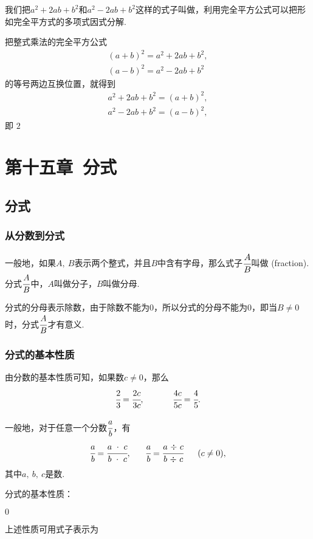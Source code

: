 \documentclass[UTF8,fontset=macnew]{book} %
\begin{document}
				我们把$a^2+2ab+b^2$和$a^2-2ab+b^2$这样的式子叫做\textcolor[RGB]{4,165,218}{}，利用完全平方公式可以把形如完全平方式的多项式因式分解.
				
				把整式乘法的完全平方公式
			$$\begin{gathered}(a+b)^2=a^2+2ab+b^2,\\(a-b)^2=a^2-2ab+b^2\end{gathered}$$
			的等号两边互换位置，就得到
			$$\boxed{\begin{gathered}a^2+2ab+b^2=(a+b)^2,\\a^2-2ab+b^2=(a-b)^2,\end{gathered}}$$
			即\textcolor[RGB]{4,165,218}{ $2$ }
	\chapter{第十五章\ 分式}
		\section{分式}
			\subsection{从分数到分式}
				一般地，如果$A,\ B$表示两个整式，并且$B$中含有字母，那么式子$\cfrac{A}{B}$叫做\textcolor[RGB]{4,165,218}{} (fraction). 分式$\cfrac{A}{B}$中，$A$叫做分子，$B$叫做分母.
				
				分式的分母表示除数，由于除数不能为$0$，所以分式的分母不能为$0$，即当$B \ne 0$时，分式$\cfrac{A}{B}$才有意义.
			\subsection{分式的基本性质}
				由分数的基本性质可知，如果数$c \ne 0$，那么
			$$\cfrac{2}{3} =\cfrac{2c}{3c},\ \ \ \ \ \ \ \ \ \ \cfrac{4c}{5c}=\cfrac{4}{5}.    $$
			
				一般地，对于任意一个分数$\cfrac{a}{b}$，有
			$$\cfrac{a}{b} =\cfrac{a\ \cdot \ c}{b\ \cdot \ c},\ \ \ \ \ \cfrac{a}{b}=\cfrac{a\ {\div} \ c}{b\ {\div} \ c}\ \ \ \ \ (c\ne 0),    $$
			其中$a,\ b,\ c$是数.
			
				分式的基本性质：
				
				\textcolor[RGB]{4,165,218}{ $0$}
				
				上述性质可用式子表示为
				
\end{document}
